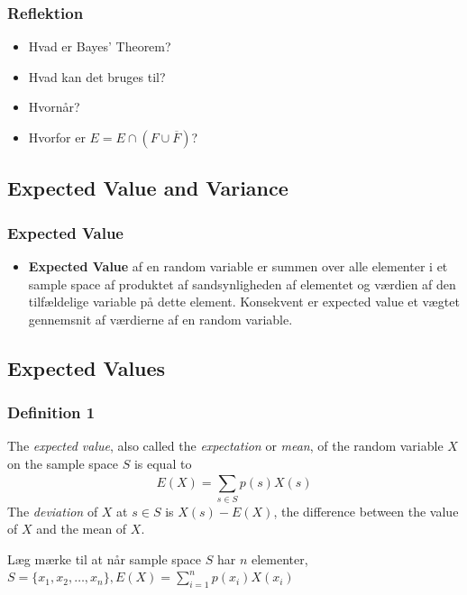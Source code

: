 \documentclass{beamer}
\begin{document}
\begin{frame}
  \frametitle{Reflektion}
  \begin{itemize}
  \item Hvad er Bayes' Theorem?
  \item Hvad kan det bruges til?
  \item Hvornår?
  \item Hvorfor er $E = E \cap (F \cup \overline{F})$?
  \end{itemize}
  
\end{frame}

\subsection{Expected Value and Variance}
\label{subsec:expectedvalue}

\begin{frame}
  \frametitle{Expected Value}
  \begin{itemize}
  \item \textbf{Expected Value} af en random variable er summen over alle elementer i et sample space af produktet af sandsynligheden af elementet og værdien af den tilfældelige variable på dette element. Konsekvent er expected value et vægtet gennemsnit af værdierne af en random variable.
  \end{itemize}
\end{frame}

\subsection{Expected Values}
\label{subsec:expected-values}

\begin{frame}
  \frametitle{Definition 1}
  \begin{definition}
    The \textit{expected value}, also called the \textit{expectation} or \textit{mean}, of the random variable $X$ on the sample space $S$ is equal to
    \[ E(X) = \sum_{s \in S}^{}p(s)X(s) \]
    The \textit{deviation} of $X$ at $s \in S$ is $X(s)-E(X)$, the difference between the value of $X$ and the mean of $X$.
  \end{definition}
  Læg mærke til at når sample space $S$ har $n$ elementer, $S = \{x_{1}, x_{2}, \ldots, x_{n}\}, E(X) = \sum_{i=1}^{n}p(x_{i})X(x_{i})$
\end{frame}
\end{document}
